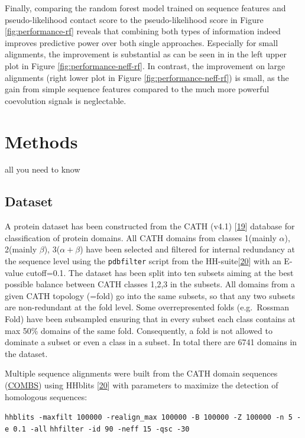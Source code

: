 \documentclass[12pt,a4paper,twoside]{book}
\theoremstyle{definition}
\theoremstyle{definition}
\theoremstyle{remark}
\begin{document}
Finally, comparing the random forest model trained on sequence features
and pseudo-likelihood contact score to the pseudo-likelihood score in
Figure \ref{fig:performance-rf} reveals that combining both types of
information indeed improves predictive power over both single
approaches. Especially for small alignments, the improvement is
substantial as can be seen in in the left upper plot in Figure
\ref{fig:performance-neff-rf}. In contrast, the improvement on large
alignments (right lower plot in Figure \ref{fig:performance-neff-rf}) is
small, as the gain from simple sequence features compared to the much
more powerful coevolution signals is neglectable.

\chapter{Methods}\label{methods}

all you need to know

\section{Dataset}\label{dataset}

A protein dataset has been constructed from the CATH (v4.1)
{[}\protect\hyperlink{ref-Sillitoe2015}{19}{]} database for
classification of protein domains. All CATH domains from classes
1(mainly \(\alpha\)), 2(mainly \(\beta\)), 3(\(\alpha+\beta\)) have been
selected and filtered for internal redundancy at the sequence level
using the \texttt{pdbfilter} script from the
HH-suite{[}\protect\hyperlink{ref-Remmert2012}{20}{]} with an E-value
cutoff=0.1. The dataset has been split into ten subsets aiming at the
best possible balance between CATH classes 1,2,3 in the subsets. All
domains from a given CATH topology (=fold) go into the same subsets, so
that any two subsets are non-redundant at the fold level. Some
overrepresented folds (e.g.~Rossman Fold) have been subsampled ensuring
that in every subset each class contains at max 50\% domains of the same
fold. Consequently, a fold is not allowed to dominate a subset or even a
class in a subset. In total there are 6741 domains in the dataset.

Multiple sequence alignments were built from the CATH domain sequences
(\href{http://www.cathdb.info/version/current/domain/3cdjA03/sequence}{COMBS})
using HHblits {[}\protect\hyperlink{ref-Remmert2012}{20}{]} with
parameters to maximize the detection of homologous sequences:

\texttt{hhblits\ -maxfilt\ 100000\ -realign\_max\ 100000\ -B\ 100000\ -Z\ 100000\ -n\ 5\ -e\ 0.1\ -all}
\texttt{hhfilter\ -id\ 90\ -neff\ 15\ -qsc\ -30}
\end{document}
